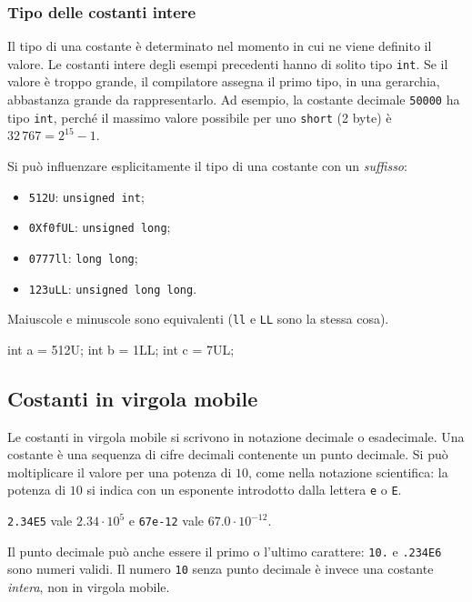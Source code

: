 \documentclass[11pt,a4paper]{article}
\begin{document}
\subsubsection{Tipo delle costanti intere}

Il tipo di una costante è determinato nel momento in cui ne viene definito il valore. Le costanti intere degli esempi precedenti hanno di solito tipo \lstinline|int|. Se il valore è troppo grande, il compilatore assegna il primo tipo, in una gerarchia, abbastanza grande da rappresentarlo. Ad esempio, la costante decimale \lstinline|50000| ha tipo \lstinline|int|, perché il massimo valore possibile per uno \lstinline|short| (2 byte) è $32\,767 = 2^{15} - 1$.

Si può influenzare esplicitamente il tipo di una costante con un \emph{suffisso}:
\begin{itemize}
    \item \lstinline|512U|: \lstinline|unsigned int|;
    \item \lstinline|0Xf0fUL|: \lstinline|unsigned long|;
    \item \lstinline|0777ll|: \lstinline|long long|;
    \item \lstinline|123uLL|: \lstinline|unsigned long long|.
\end{itemize}
Maiuscole e minuscole sono equivalenti (\lstinline|ll| e \lstinline|LL| sono la stessa cosa).

\begin{codice}
int a = 512U;
int b = 1LL;
int c = 7UL;
\end{codice}

\subsection{Costanti in virgola mobile}

Le costanti in virgola mobile si scrivono in notazione decimale o esadecimale. Una costante è una sequenza di cifre decimali contenente un punto decimale. Si può moltiplicare il valore per una potenza di $10$, come nella notazione scientifica: la potenza di $10$ si indica con un esponente introdotto dalla lettera \lstinline|e| o \lstinline|E|.

\begin{esempio}
\lstinline|2.34E5| vale $2.34 \cdot 10^5$ e \lstinline|67e-12| vale $67.0 \cdot 10^{-12}$.
\end{esempio}

Il punto decimale può anche essere il primo o l'ultimo carattere: \lstinline|10.| e \lstinline|.234E6| sono numeri validi. Il numero \lstinline|10| senza punto decimale è invece una costante \emph{intera}, non in virgola mobile.
\end{document}
